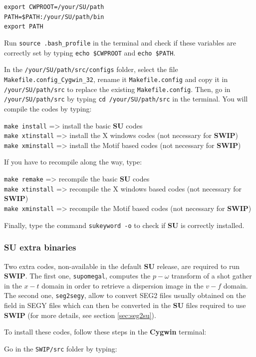 \documentclass[twoside,a4paper]{article}
\def\SWIP{\textbf{SWIP}}
\def\SU{\textbf{SU}}
\def\Cygwin{\textbf{Cygwin}}
\begin{document}
\verb|export CWPROOT=/your/SU/path|\\
\verb|PATH=$PATH:/your/SU/path/bin|\\
\verb|export PATH|

Run \verb|source .bash_profile| in the terminal and check if these variables are correctly set by typing \verb|echo $CWPROOT| and \verb|echo $PATH|.

In the \verb|/your/SU/path/src/configs| folder, select the file \verb|Makefile.config_Cygwin_32|, rename it \verb|Makefile.config| and copy it in \verb|/your/SU/path/src| to replace the existing \verb|Makefile.config|. Then, go in \verb|/your/SU/path/src| by typing \verb|cd /your/SU/path/src| in the terminal. You will compile the codes by typing:

\verb|make install| => install the basic {\SU} codes\\
\verb|make xtinstall| => install the X windows codes (not necessary for {\SWIP})\\
\verb|make xminstall| => install the Motif based codes (not necessary for {\SWIP})

If you have to recompile along the way, type:

\verb|make remake| => recompile the basic {\SU} codes\\
\verb|make xtinstall| => recompile the X windows based codes (not necessary for {\SWIP})\\
\verb|make xminstall| => recompile the Motif based codes (not necessary for {\SWIP})

Finally, type the command \verb|sukeyword -o| to check if {\SU} is correctly installed.

\subsubsection{SU extra binaries}
Two extra codes, non-available in the default {\SU} release, are required to run {\SWIP}. The first one, \verb|supomegal|, computes the $p-\omega$ transform of a shot gather in the $x-t$ domain in order to retrieve a dispersion image in the $v-f$ domain. The second one, \verb|seg2segy|, allow to convert SEG2 files usually obtained on the field in SEGY files which can then be converted in the {\SU} files required to use {\SWIP} (for more details, see section \ref{sec:seg2su}).

To install these codes, follow these steps in the {\Cygwin} terminal:

Go in the \verb|SWIP/src| folder by typing: 
\end{document}

